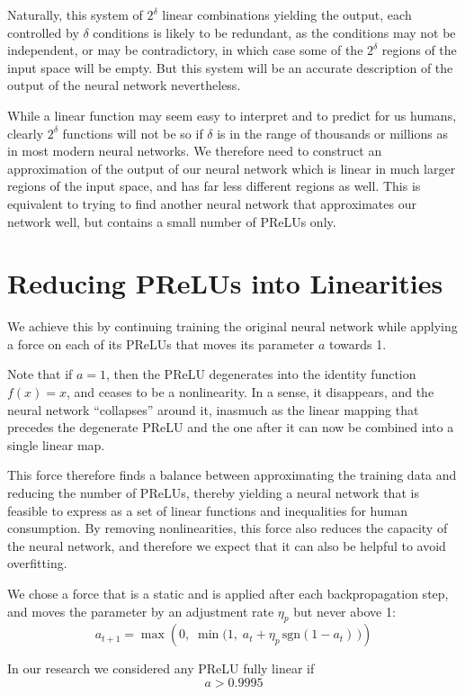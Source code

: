 \documentclass{article}[12pt]
\newcommand{\myskip}{\bigskip\noindent}
\begin{document}
Naturally, this system of $2^\delta$ linear combinations yielding the output, each controlled by $\delta$
conditions is likely to be redundant, as the conditions may not be independent,
or may be contradictory, in which case some of the $2^\delta$ regions of the input space will be empty.
But this system will be an accurate description of the output of the neural network nevertheless.

\myskip
While a linear function may seem easy to interpret and to predict for us humans, clearly $2^\delta$
functions will not be so if $\delta$ is in the range of thousands or millions as in most modern neural networks.
We therefore need to construct an approximation of the output of our neural network which is linear in much
larger regions of the input space, and has far less different regions as well.
This is equivalent to trying to find another neural network that approximates our network well,
but contains a small number of PReLUs only.

\section{Reducing PReLUs into Linearities}

We achieve this by continuing training the original neural network while applying a force on each of
its PReLUs that moves its parameter $a$ towards 1.

Note that if $a=1$, then the PReLU degenerates into the identity function $f(x)=x$, and ceases to be a nonlinearity.
In a sense, it disappears, and the neural network ``collapses'' around it, inasmuch as the linear mapping
that precedes the degenerate PReLU and the one after it can now be combined into a single linear map.

This force therefore finds a balance between approximating the training data
and reducing the number of PReLUs, thereby yielding a neural network that is feasible to express
as a set of linear functions and inequalities for human consumption.
By removing nonlinearities, this force also reduces the capacity of the neural network,
and therefore we expect that it can also be helpful to avoid overfitting.

We chose a
force that is a static and is applied after each backpropagation step, and moves the parameter by an adjustment rate
$\eta_p$ but never above 1:
\[ a_{t+1} = \max\left(0,\;\min\big(1,\;a_t + \eta_p\,\mathrm{sgn}(1-a_t)\,\big)\right) \]

In our research we considered any PReLU fully linear if
\[ a > 0.9995 \]
\end{document}
